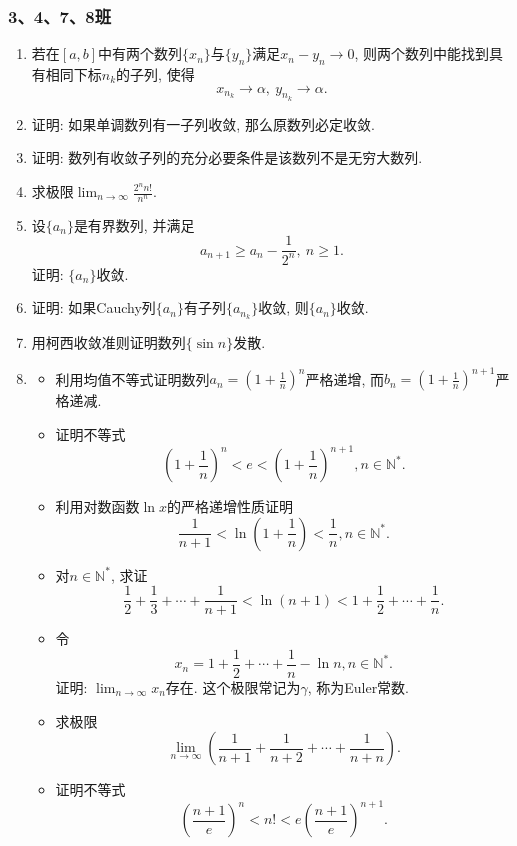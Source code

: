 \documentclass[UTF8,11pt, a4paper, oneside, fontset=none]{ctexbook}
\begin{document}
\subsubsection*{3、4、7、8班}
\begin{enumerate}
\item 若在$[a, b]$中有两个数列$\{ x_n \}$与$\{ y_n \}$满足$x_n - y_n \to 0$, 则两个数列中能找到具有相同下标$n_k$的子列, 使得
\[
x_{n_k} \to \alpha, \ y_{n_k} \to \alpha.
\]

\item 证明: 如果单调数列有一子列收敛, 那么原数列必定收敛.

\item 证明: 数列有收敛子列的充分必要条件是该数列不是无穷大数列.

\item 求极限$\lim_{n \to \infty} \frac{2^n n!}{n^n}$.

\item 设$\{a_n\}$是有界数列, 并满足
\[
a_{n+1} \geq a_n - \frac{1}{2^n}, \ n \geq 1.
\]
证明: $\{a_n\}$收敛.

\item 证明: 如果Cauchy列$\{a_n\}$有子列$\{ a_{n_k}\}$收敛, 则$\{a_n\}$收敛.

\item 用柯西收敛准则证明数列$\{ \sin n \}$发散.

\item
\begin{itemize}
\item[(1)] 利用均值不等式证明数列$a_n = \left( 1 + \frac{1}{n}\right)^n$严格递增, 而$b_n = \left( 1 + \frac{1}{n}\right)^{n+1}$严格递减.
\item[(2)] 证明不等式
\[
\left( 1 + \frac{1}{n}\right)^n < e < \left( 1 + \frac{1}{n}\right)^{n+1}, n \in \mathbb N^*.
\]
\item[(3)] 利用对数函数$\ln x$的严格递增性质证明
\[
\frac{1}{n+1} < \ln(1 + \frac{1}{n}) < \frac{1}{n}, n \in \mathbb N^*.
\]
\item[(4)] 对$n \in \mathbb N^*$, 求证
\[
\frac{1}{2} + \frac{1}{3} + \cdots + \frac{1}{n+1} < \ln(n+1) < 1 + \frac{1}{2} + \cdots + \frac{1}{n}.
\]
\item[(5)] 令
\[
x_n = 1 + \frac{1}{2} + \cdots +\frac{1}{n} - \ln n, n \in \mathbb N^*.
\]
证明: $\lim_{n \to \infty} x_n$存在. 这个极限常记为$\gamma$, 称为Euler常数.
\item[(6)] 求极限
\[
\lim_{n \to \infty} \left( \frac{1}{n+1} + \frac{1}{n+2} + \cdots + \frac{1}{n+n}\right).
\]
\item[(7)] 证明不等式
\[
\left( \frac{n+1}{e} \right)^n < n! < e \left( \frac{n+1}{e} \right)^{n+1}.
\]
\end{itemize}

\end{enumerate}
\clearpage
\end{document}
